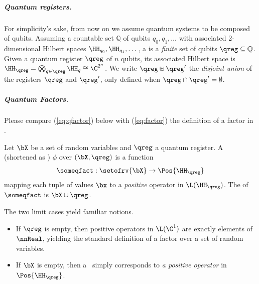 
\subparagraph*{Quantum registers.}

For simplicity's sake, from now on we assume quantum systems to be composed of qubits.
Assuming a countable set $\mathbb{Q}$ of qubits $q_0,q_1,\dots$ with associated 2-dimensional Hilbert spaces $\HH_{q_0},\HH_{q_1},\dots$, a  is a \emph{finite} set of qubits $\qreg \subseteq \mathbb{Q}$.
Given a quantum register $\qreg$ of $n$ qubits, its associated Hilbert space is $\HH_{\qreg} = \bigotimes_{q \in \qreg} \HH_{q} \cong \C^{2^n}$.
We write $\qreg \uplus \qreg'$ the \emph{disjoint union} of the registers $\qreg$ and $\qreg'$, only defined when $\qreg \cap \qreg' = \emptyset$.

\subparagraph*{Quantum Factors.}

Please compare (\ref{eq:qfactor}) below with (\ref{eq:factor}) the definition of a factor in .

\begin{definition}
Let $\bX$ be a set of random variables and $\qreg$ a quantum register.
A  (shortened as ) $\phi$ over $(\bX,\qreg)$ is a function
\begin{equation}\label{eq:qfactor}
\someqfact: \setofrv{\bX} \to \Pos{\HH_\qreg}
\end{equation}
mapping each tuple of values $\bx$ to a \emph{positive} operator in $\L(\HH_\qreg)$.
The  of $\someqfact$ is $\bX\cup\qreg$.
\end{definition}

\begin{remark}
The two limit cases yield familiar notions.
\begin{itemize}
\item
If $\qreg$ is empty, then positive operators in $\L(\C^1)$ are exactly elements of $\nnReal$, yielding the standard definition of a factor over a set of random variables.
\item
If $\bX$ is empty, then a \qfactor\ simply corresponds to \emph{a positive operator} in $\Pos{\HH_\qreg}$.
\end{itemize}
\end{remark}

